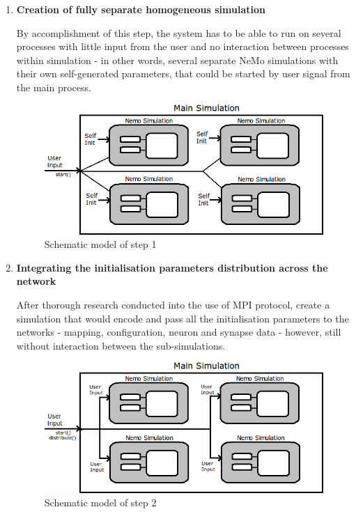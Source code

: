 \begin{enumerate}

\item{\textbf{Creation of fully separate homogeneous simulation}}

By accomplishment of this step, the system has to be able to run on several processes with little input from the user and no interaction between processes within simulation - in other words, several separate NeMo simulations with their own self-generated parameters, that could be started by user signal from the main process.

\begin{figure}[h!]
\begin{center}
\includegraphics[scale = 0.7]{images/design_stage_1.png}
\end{center}
\caption{Schematic model of step 1}
\end{figure}

\item{\textbf{Integrating the initialisation parameters distribution across the network}}

After thorough research conducted into the use of MPI protocol, create a simulation that would encode and pass all the initialisation parameters to the networks - mapping, configuration, neuron and synapse data - however, still without interaction between the sub-simulations.

\begin{figure}[h!]
\begin{center}
\includegraphics[scale = 0.7]{images/design_stage_2.png}
\end{center}
\caption{Schematic model of step 2}
\end{figure}


\end{enumerate}
